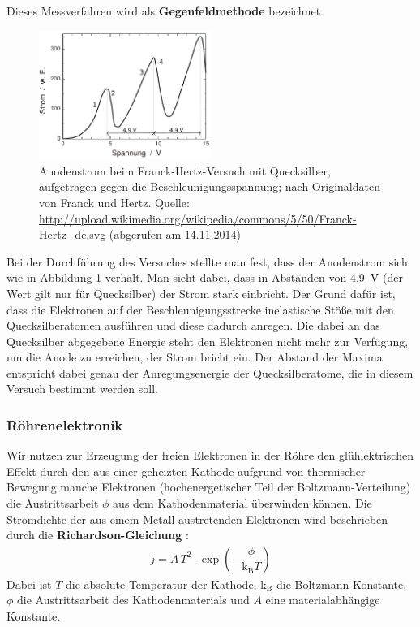 \documentclass[11pt, a4paper]{article}
\begin{document}
Dieses Messverfahren wird als \textbf{Gegenfeldmethode} bezeichnet.
\begin{figure}[h]
\centering
\includegraphics[width=0.5\textwidth]{./figures/franck-hertz_ergebnis.pdf}
\caption{Anodenstrom beim Franck-Hertz-Versuch mit Quecksilber, aufgetragen gegen die Beschleunigungsspannung; nach Originaldaten von Franck und Hertz. Quelle: \url{http://upload.wikimedia.org/wikipedia/commons/5/50/Franck-Hertz_de.svg} (abgerufen am 14.11.2014)}
\label{fig:franck-hertz_ergebnis}
\end{figure}
Bei der Durchführung des Versuches stellte man fest, dass der Anodenstrom sich wie in Abbildung \ref{fig:franck-hertz_ergebnis} verhält.
Man sieht dabei, dass in Abständen von \SI{4.9}{\volt} (der Wert gilt nur für Quecksilber) der Strom stark einbricht.
Der Grund dafür ist, dass die Elektronen auf der Beschleunigungsstrecke inelastische Stöße mit den Quecksilberatomen ausführen und diese dadurch anregen.
Die dabei an das Quecksilber abgegebene Energie steht den Elektronen nicht mehr zur Verfügung, um die Anode zu erreichen, der Strom bricht ein. 
Der Abstand der Maxima entspricht dabei genau der Anregungsenergie der Quecksilberatome, die in diesem Versuch bestimmt werden soll.

\subsubsection{Röhrenelektronik}
\label{sec:roehrenelektronik}
Wir nutzen zur Erzeugung der freien Elektronen in der Röhre den glühlektrischen Effekt durch den aus einer geheizten Kathode aufgrund von thermischer Bewegung manche Elektronen (hochenergetischer Teil der Boltzmann-Verteilung) die Austrittsarbeit $\phi$ aus dem Kathodenmaterial überwinden können.
Die Stromdichte der aus einem Metall austretenden Elektronen wird beschrieben durch die \textbf{Richardson-Gleichung} \cite{np_richardson}:
\begin{align*}
j=A\,T^2\cdot\exp\left({-\dfrac{\phi}{\mathrm{k_B}T}}\right)
\end{align*}
Dabei ist $T$ die absolute Temperatur der Kathode, $\mathrm{k_B}$ die Boltzmann-Konstante, $\phi$ die Austrittsarbeit des Kathodenmaterials und $A$ eine materialabhängige Konstante.
\end{document}
